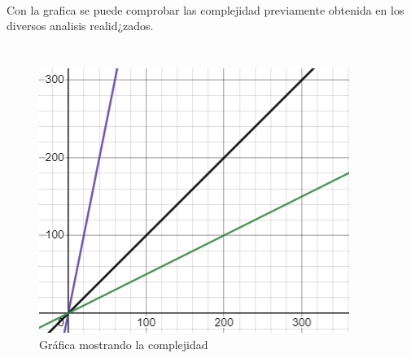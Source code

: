 \documentclass[12pt,twoside]{article}
\begin{document}
\\
Con la grafica se puede comprobar las complejidad previamente obtenida en los diversos analisis realid¿zados.
\\
\\
\subsubsection{}
\begin{figure}[h!]
\centering
\includegraphics[scale=0.5]{graf.png}
\caption{Gráfica mostrando la complejidad}
\label{fig:universe}
\end{figure}

\clearpage
\end{document}
